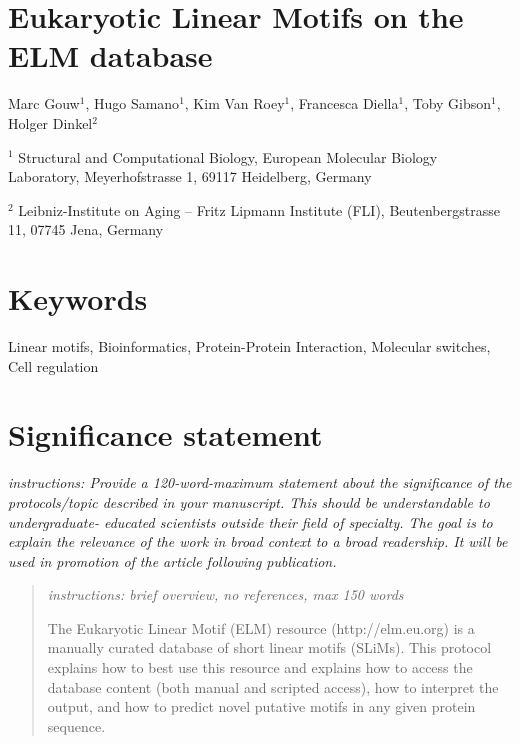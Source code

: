 \section*{Eukaryotic Linear Motifs on the ELM database}

Marc Gouw$^{1}$,
Hugo Samano$^{1}$,
Kim Van Roey$^{1}$,
Francesca Diella$^{1}$,
Toby Gibson$^{1}$,
Holger Dinkel$^{2}$

$^{1}$ Structural and Computational Biology, European Molecular Biology
Laboratory, Meyerhofstrasse 1, 69117 Heidelberg, Germany

$^{2}$ Leibniz-Institute on Aging -- Fritz Lipmann Institute (FLI),
Beutenbergstrasse 11, 07745 Jena, Germany

\section*{Keywords}

Linear motifs, Bioinformatics, Protein-Protein Interaction, Molecular
switches, Cell regulation

\section*{Significance statement}

\emph{instructions: Provide a 120-word-maximum statement about the
significance of the protocols/topic described in your manuscript. This
should be understandable to undergraduate- educated scientists outside
their field of specialty. The goal is to explain the relevance of the
work in broad context to a broad readership. It will be used in
promotion of the article following publication.}

\begin{abstract}

\emph{instructions: brief overview, no references, max 150 words}

The Eukaryotic Linear Motif (ELM) resource (http://elm.eu.org) is a
manually curated database of short linear motifs (SLiMs). This protocol
explains how to best use this resource and explains how to access the
database content (both manual and scripted access), how to interpret the
output, and how to predict novel putative motifs in any given protein
sequence.

\end{abstract}


